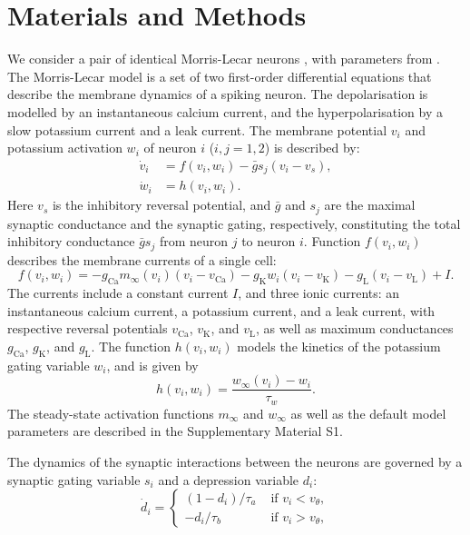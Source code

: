 \documentclass[utf8]{frontiersFPHY} %
\renewcommand{\k}{\mathrm{K}}
\newcommand{\ca}{\mathrm{Ca}}
\newcommand{\leak}{\mathrm{L}}
\newcommand{\gbar}{\bar g}
\begin{document}
\section{Materials and Methods}
We consider a pair of identical Morris-Lecar neurons \citep{morris1981}, with parameters from \cite{bose2011}.
The Morris-Lecar model is a set of two first-order differential equations that describe the membrane dynamics of a spiking neuron.
The depolarisation is modelled by an instantaneous calcium current, and the hyperpolarisation by a slow potassium current and a leak current.
The membrane potential $v_{i}$ and potassium activation $w_{i}$ of neuron $i$ ($i, j=1,2$) is described by:
\begin{align}
	\label{eq:cell-modelA}
	\dot v_{i} & = f(v_{i}, w_{i}) -\bar g s_j(v_i-v_{s}), \\
	\label{eq:cell-modelB}
	\dot w_{i} & =h(v_i,w_i).
\end{align}
Here $v_{s}$ is the inhibitory reversal potential, and $\gbar$ and $s_{j}$ are the maximal synaptic conductance and the synaptic gating, respectively, constituting the total inhibitory conductance $\bar g s_{j}$ from neuron $j$ to neuron $i$.
Function $f(v_{i}, w_{i})$ describes the membrane currents of a single cell:
\begin{equation}
	\label{eq:f}
	f(v_{i}, w_{i}) = -g_{\ca}m_{\infty}(v_{i})(v_{i}-v_{\ca}) - g_{\k}w_{i}(v_{i}-v_{\k})
	-g_{\leak}(v_{i}-v_{\leak}) + I.
\end{equation}
The currents include a constant current $I$, and three ionic currents: an instantaneous calcium current, a potassium current, and a leak current, with respective reversal
potentials $v_{\ca}$, $v_{\k}$, and $v_{\leak}$, as well as maximum conductances
$g_{\ca}$, $g_{\k}$, and $g_{\leak}$.  The function $h(v_{i}, w_{i})$ models the
kinetics of the potassium gating variable $w_{i}$, and is given by
\begin{equation}
	\label{eq:h}
	h(v_{i}, w_{i})=\frac{w_{\infty}(v_{i})-w_{i}}{\tau_{w}}.
\end{equation}
The steady-state activation functions $m_{\infty}$ and $w_{\infty}$ as well as the default model parameters are described in the Supplementary Material S1.

The dynamics of the synaptic interactions between the neurons are governed by a synaptic gating variable $s_{i}$ and a depression variable $d_{i}$:
\begin{equation}
	\label{eq:dot-d}
	\dot d_{i} = \begin{cases}
		(1-d_{i})/\tau_{a} & \text{ if } v_{i}<v_{\theta}, \\
		-d_{i}/\tau_{b}    & \text{ if } v_{i}>v_{\theta},
	\end{cases}
\end{equation}
\end{document}

